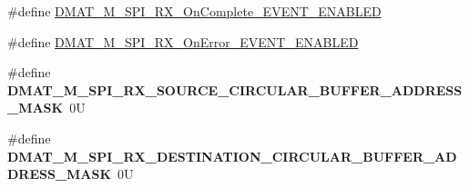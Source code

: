 \begin{DoxyCompactItemize}
\item 
\#define \hyperlink{group___d_m_a_t___m___s_p_i___r_x__module_ga36c58151d4df1aa4c4b09277f9a4388c}{D\-M\-A\-T\-\_\-\-M\-\_\-\-S\-P\-I\-\_\-\-R\-X\-\_\-\-On\-Complete\-\_\-\-E\-V\-E\-N\-T\-\_\-\-E\-N\-A\-B\-L\-E\-D}
\item 
\#define \hyperlink{group___d_m_a_t___m___s_p_i___r_x__module_ga74c22ce23cc6790ecd3bec9294f56f4c}{D\-M\-A\-T\-\_\-\-M\-\_\-\-S\-P\-I\-\_\-\-R\-X\-\_\-\-On\-Error\-\_\-\-E\-V\-E\-N\-T\-\_\-\-E\-N\-A\-B\-L\-E\-D}
\item 
\hypertarget{group___d_m_a_t___m___s_p_i___r_x__module_ga44c8b72c80657120a6d850278f0cd851}{\#define {\bfseries D\-M\-A\-T\-\_\-\-M\-\_\-\-S\-P\-I\-\_\-\-R\-X\-\_\-\-S\-O\-U\-R\-C\-E\-\_\-\-C\-I\-R\-C\-U\-L\-A\-R\-\_\-\-B\-U\-F\-F\-E\-R\-\_\-\-A\-D\-D\-R\-E\-S\-S\-\_\-\-M\-A\-S\-K}~0\-U}\label{group___d_m_a_t___m___s_p_i___r_x__module_ga44c8b72c80657120a6d850278f0cd851}

\item 
\hypertarget{group___d_m_a_t___m___s_p_i___r_x__module_ga4c6cf53f9c32b888b7698b58ff5b5271}{\#define {\bfseries D\-M\-A\-T\-\_\-\-M\-\_\-\-S\-P\-I\-\_\-\-R\-X\-\_\-\-D\-E\-S\-T\-I\-N\-A\-T\-I\-O\-N\-\_\-\-C\-I\-R\-C\-U\-L\-A\-R\-\_\-\-B\-U\-F\-F\-E\-R\-\_\-\-A\-D\-D\-R\-E\-S\-S\-\_\-\-M\-A\-S\-K}~0\-U}\label{group___d_m_a_t___m___s_p_i___r_x__module_ga4c6cf53f9c32b888b7698b58ff5b5271}

\end{DoxyCompactItemize}
